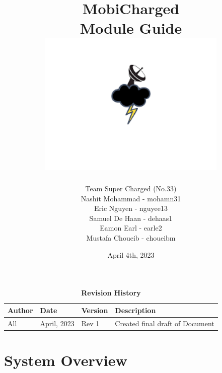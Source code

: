 \documentclass[12pt, titlepage]{article}
\begin{document}
\title{
    MobiCharged\\Module Guide 
    \includegraphics[width=9cm]{images/mobicharged.png} 
}
\author{Team Super Charged (No.33)
		\\ Nashit Mohammad - mohamn31
		\\ Eric Nguyen - nguyee13
		\\ Samuel De Haan - dehaas1
		\\ Eamon Earl - earle2
		\\ Mustafa Choueib - choueibm
}
    

\date{April 4th, 2023}


\maketitle

\tableofcontents
\listoffigures
\listoftables

\vspace{20pt}
\begin{center}
\begin{table}[H]
\caption{\bf Revision History}
    \begin{tabular}{p{2cm}p{3cm}p{2cm}p{6cm}}
    \hline
    \bf Author & \bf Date & \bf Version & \bf Description\\
    \hline
    All & April, 2023 & Rev 1 & Created final draft of Document \\
    \hline
    \end{tabular}
\end{table}
\end{center}

\newpage


\section{System Overview}
\end{document}
